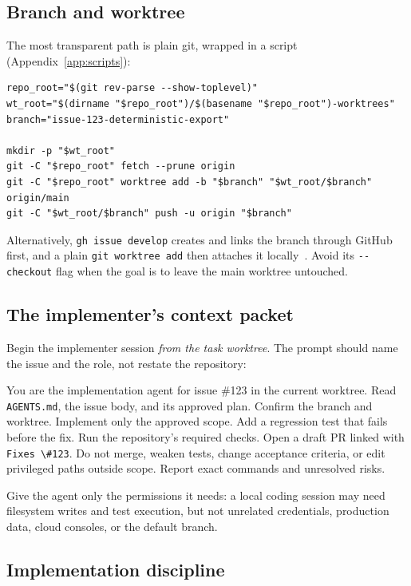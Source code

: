 \documentclass[11pt]{article}
\newcommand{\co}[1]{\lstinline[basicstyle=\ttfamily\color{gwInk}]{#1}}
\begin{document}
\subsection{Branch and worktree}

The most transparent path is plain git, wrapped in a script
(Appendix~\ref{app:scripts}):

\begin{lstlisting}[style=gw]
repo_root="$(git rev-parse --show-toplevel)"
wt_root="$(dirname "$repo_root")/$(basename "$repo_root")-worktrees"
branch="issue-123-deterministic-export"

mkdir -p "$wt_root"
git -C "$repo_root" fetch --prune origin
git -C "$repo_root" worktree add -b "$branch" "$wt_root/$branch" origin/main
git -C "$wt_root/$branch" push -u origin "$branch"
\end{lstlisting}

Alternatively, \co{gh issue develop} creates and links the branch through GitHub first, and a
plain \co{git worktree add} then attaches it locally~\cite{github2026issuedevelop}. Avoid its
\co{--checkout} flag when the goal is to leave the main worktree untouched.

\subsection{The implementer's context packet}

Begin the implementer session \emph{from the task worktree}. The prompt should name the issue and
the role, not restate the repository:

\begin{keyidea}
You are the implementation agent for issue \#123 in the current worktree. Read
\co{AGENTS.md}, the issue body, and its approved plan. Confirm the branch and worktree.
Implement only the approved scope. Add a regression test that fails before the fix. Run the
repository's required checks. Open a draft PR linked with \co{Fixes \#123}. Do not merge, weaken
tests, change acceptance criteria, or edit privileged paths outside scope. Report exact commands
and unresolved risks.
\end{keyidea}

Give the agent only the permissions it needs: a local coding session may need filesystem writes
and test execution, but not unrelated credentials, production data, cloud consoles, or the
default branch.

\subsection{Implementation discipline}
\end{document}
